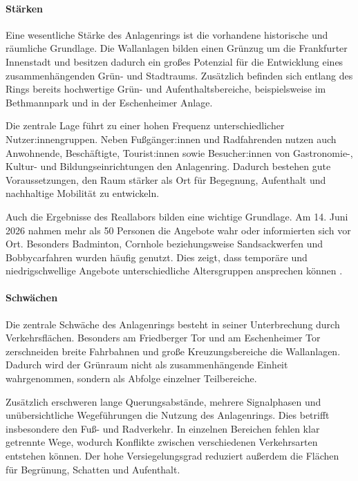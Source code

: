 \documentclass[a4paper,12pt]{article}
\begin{document}
\paragraph{Stärken}

Eine wesentliche Stärke des Anlagenrings ist die vorhandene historische und räumliche Grundlage. Die Wallanlagen bilden einen Grünzug um die Frankfurter Innenstadt und besitzen dadurch ein großes Potenzial für die Entwicklung eines zusammenhängenden Grün- und Stadtraums. Zusätzlich befinden sich entlang des Rings bereits hochwertige Grün- und Aufenthaltsbereiche, beispielsweise im Bethmannpark und in der Eschenheimer Anlage.

Die zentrale Lage führt zu einer hohen Frequenz unterschiedlicher Nutzer:innengruppen. Neben Fußgänger:innen und Radfahrenden nutzen auch Anwohnende, Beschäftigte, Tourist:innen sowie Besucher:innen von Gastronomie-, Kultur- und Bildungseinrichtungen den Anlagenring. Dadurch bestehen gute Voraussetzungen, den Raum stärker als Ort für Begegnung, Aufenthalt und nachhaltige Mobilität zu entwickeln.

Auch die Ergebnisse des Reallabors bilden eine wichtige Grundlage. Am 14. Juni 2026 nahmen mehr als 50 Personen die Angebote wahr oder informierten sich vor Ort. Besonders Badminton, Cornhole beziehungsweise Sandsackwerfen und Bobbycarfahren wurden häufig genutzt. Dies zeigt, dass temporäre und niedrigschwellige Angebote unterschiedliche Altersgruppen ansprechen können \autocite{eigeneerhebung2026}.

\paragraph{Schwächen}

Die zentrale Schwäche des Anlagenrings besteht in seiner Unterbrechung durch Verkehrsflächen. Besonders am Friedberger Tor und am Eschenheimer Tor zerschneiden breite Fahrbahnen und große Kreuzungsbereiche die Wallanlagen. Dadurch wird der Grünraum nicht als zusammenhängende Einheit wahrgenommen, sondern als Abfolge einzelner Teilbereiche.

Zusätzlich erschweren lange Querungsabstände, mehrere Signalphasen und unübersichtliche Wegeführungen die Nutzung des Anlagenrings. Dies betrifft insbesondere den Fuß- und Radverkehr. In einzelnen Bereichen fehlen klar getrennte Wege, wodurch Konflikte zwischen verschiedenen Verkehrsarten entstehen können. Der hohe Versiegelungsgrad reduziert außerdem die Flächen für Begrünung, Schatten und Aufenthalt.
\end{document}
